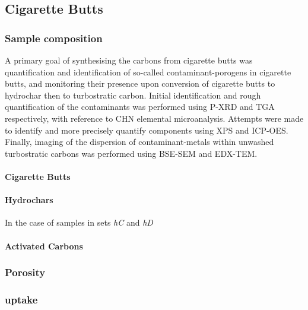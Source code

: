 \subsection{Cigarette Butts}
\label{ss:cigarette_butts}


\subsubsection{Sample composition}
A primary goal of synthesising the carbons from cigarette butts was quantification and identification of so-called contaminant-porogens in cigarette butts, and monitoring their presence upon conversion of cigarette butts to hydrochar then to turbostratic carbon. Initial identification and rough quantification of the contaminants was performed using P-XRD and TGA respectively, with reference to CHN elemental microanalysis. Attempts were made to identify and more precisely quantify components using XPS and ICP-OES. Finally, imaging of the dispersion of contaminant-metals within unwashed turbostratic carbons was performed using BSE-SEM and EDX-TEM.

\paragraph{Cigarette Butts}

\paragraph{Hydrochars}
In the case of samples in sets \textit{hC} and \textit{hD} 

\paragraph{Activated Carbons}

\subsubsection{Porosity}

\subsubsection{ uptake}